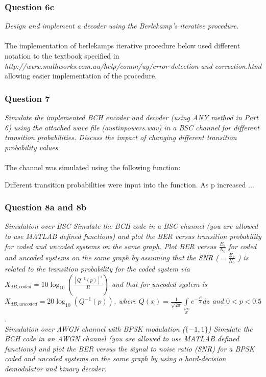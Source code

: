 \documentclass[a4paper]{article}
\begin{document}


\subsubsection*{Question 6c} \textit{Design and implement a decoder using the Berlekamp’s iterative procedure.}\\
\\
The implementation of berlekamps iterative procedure below used different notation to the textbook specified in \textit{http://www.mathworks.com.au/help/comm/ug/error-detection-and-correction.html} allowing easier implementation of the procedure.



\subsubsection*{Question 7} \textit{Simulate the implemented BCH encoder and decoder (using ANY method in Part 6) using the attached wave file (austinpowers.wav) in a BSC channel for different transition probabilities. Discuss the impact of changing different transition probability values.}\\
\\
The channel was simulated using the following function:



Different transition probabilities were input into the function. As p increased ...

\subsubsection*{Question 8a and 8b} \textit{Simulation over BSC Simulate the BCH code in a BSC channel (you are allowed to use MATLAB defined functions) and plot the BER versus transition probability for coded and uncoded systems on the same graph. Plot BER versus $\frac{E_b}{N_0}$ for coded and uncoded systems on the same graph by assuming that the SNR ($ = \frac{E_b}{N_0}$ ) is related to the transition probability for the coded system via $X_{dB,coded} = 10 \log_{10}(\frac{[Q^{−1} (p)]^2}{R}) $ and that for uncoded system is $X_{dB,uncoded} = 20\log_{10}(Q^{−1} (p)) $, where $Q(x) = \frac{1}{\sqrt{2 \pi}} \int\limits_{x}\limits^{+\infty} e^{ -\frac{z^2}{2}} dz $ and $0 < p < 0.5$.}\\
\textit{Simulation over AWGN channel with BPSK modulation ($\{−1, 1\}$) Simulate the BCH code in an AWGN channel (you are allowed to use MATLAB defined functions) and plot the BER versus the signal to noise ratio (SNR) for a BPSK coded and uncoded systems on the same graph by using a hard-decision demodulator and binary decoder.}\\
\\

\end{document}
